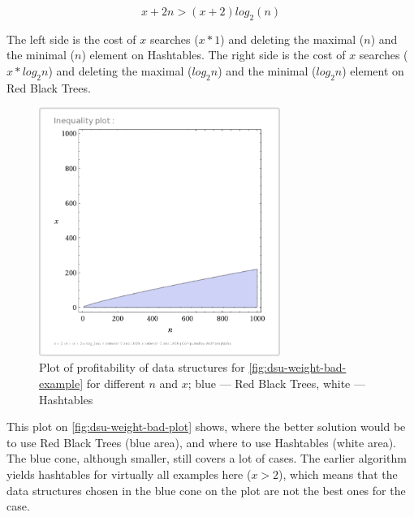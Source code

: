 \documentclass[a4paper,11pt]{article}
\begin{document}
            \begin{equation}
                x + 2n > (x + 2)log_2(n)
            \end{equation}
            
            The left side is the cost of $x$ searches ($x * 1$) and deleting the maximal ($n$) and the minimal ($n$) element on Hashtables.
            The right side is the cost of $x$ searches ($x * log_2 n$) and deleting the maximal ($log_2 n$) and the minimal ($log_2 n$) element on Red Black Trees.
                \begin{figure}[!h]
                \begin{center}
                    \includegraphics[width=0.7\textwidth]{thesis-pics/dsu-weight-example.png}
                \end{center}

                \caption{Plot of profitability of data structures for \autoref{fig:dsu-weight-bad-example} for different
                $n$ and $x$; blue --- Red Black Trees, white --- Hashtables}

                \label{fig:dsu-weight-bad-plot}
            \end{figure}

            This plot on \autoref{fig:dsu-weight-bad-plot} shows, where the better solution would be to use Red Black
            Trees (blue area), and where to use Hashtables (white area). The blue cone, although smaller, still covers a
            lot of cases. The earlier algorithm yields hashtables for virtually all examples here ($x > 2$), which means
            that the data structures chosen in the blue cone on the plot are not the best ones for the case.
\end{document}
